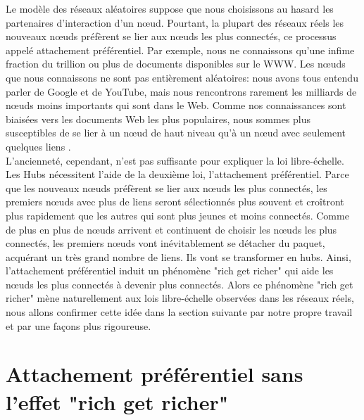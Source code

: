 Le modèle des réseaux aléatoires suppose que nous choisissons au hasard les partenaires d'interaction d'un nœud. Pourtant, la plupart des réseaux réels les nouveaux nœuds préfèrent se lier aux nœuds les plus connectés, ce processus appelé attachement préférentiel. Par exemple, nous ne connaissons qu'une infime fraction du trillion ou plus de documents disponibles sur le WWW. Les nœuds que nous connaissons ne sont pas entièrement aléatoires: nous avons tous entendu parler de Google et de YouTube, mais nous rencontrons rarement les milliards de nœuds moins importants qui sont dans le Web. Comme nos connaissances sont biaisées vers les documents Web les plus populaires, nous sommes plus susceptibles de se lier à un nœud de haut niveau qu'à un nœud avec seulement quelques liens \cite{Barabasi2002}.\\
L'ancienneté, cependant, n'est pas suffisante pour expliquer la loi libre-échelle. Les Hubs nécessitent l'aide de la deuxième loi, l'attachement préférentiel. Parce que les nouveaux nœuds préfèrent se lier aux nœuds les plus connectés, les premiers nœuds avec plus de liens seront sélectionnés plus souvent et croîtront plus rapidement que les autres qui sont plus jeunes et moins connectés. Comme de plus en plus de nœuds arrivent et continuent de choisir les nœuds les plus connectés, les premiers nœuds vont inévitablement se détacher du paquet, acquérant un très grand nombre de liens. Ils vont se transformer en hubs. Ainsi, l'attachement préférentiel induit un phénomène "rich get richer" qui aide les nœuds les plus connectés à devenir plus connectés. Alors ce phénomène "rich get richer" mène naturellement aux lois libre-échelle observées dans les réseaux réels, nous allons confirmer cette idée dans la section suivante par notre propre travail et par une façons plus rigoureuse.
\begin{sloppypar}
\section{Attachement préférentiel sans l'effet "rich get richer"}
\end{sloppypar}
